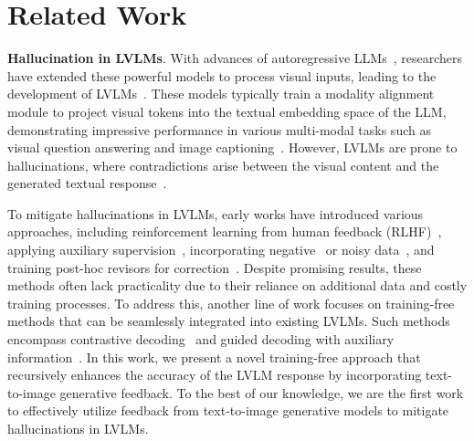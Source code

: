 \vspace{-3pt}
\section{Related Work}
\vspace{-2pt}
\textbf{Hallucination in LVLMs}.
With advances of autoregressive LLMs~\citep{touvron2023llama,chowdhery2023palm,chiang2023vicuna}, researchers have extended these powerful models to process visual inputs, leading to the development of LVLMs~\citep{liu2023visual,dai2024instructblip,bai2023qwen,ye2024mplug}. These models typically train a modality alignment module to project visual tokens into the textual embedding space of the LLM, demonstrating impressive performance in various multi-modal tasks such as visual question answering and image captioning~\citep{liu2024survey,bai2024hallucination}.
However, LVLMs are prone to hallucinations, where contradictions arise between the visual content and the generated textual response~\citep{li2023evaluating, liu2024survey, bai2024hallucination}.

To mitigate hallucinations in LVLMs, early works have introduced various approaches, including reinforcement learning from human feedback (RLHF)~\citep{gunjal2024detecting, sun2023aligning}, applying auxiliary supervision~\citep{jiang2024hallucination, chen2023mitigating}, incorporating negative~\citep{liu2023mitigating} or noisy data~\citep{yue-etal-2024-less}, and training post-hoc revisors for correction~\citep{zhou2024analyzing, yin2023woodpecker}. Despite promising results, these methods often lack practicality due to their reliance on additional data and costly training processes. To address this, another line of work focuses on training-free methods that can be seamlessly integrated into existing LVLMs.
Such methods encompass contrastive decoding~\citep{leng2024mitigating, favero2024multi} and guided decoding with auxiliary information~\citep{chen2024halc,deng2024seeing,woo2024ritual}. 
In this work, we present a novel training-free approach that recursively enhances the accuracy of the LVLM response by incorporating text-to-image generative feedback. 
To the best of our knowledge, we are the first work to effectively utilize feedback from text-to-image generative models to mitigate hallucinations in LVLMs.

